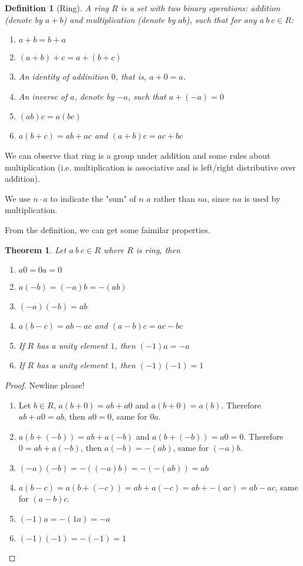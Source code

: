 \documentclass[14pt]{extarticle}
\newtheorem{theorem}{Theorem}[section]
\newtheorem{definition}{Definition}[section]
\newcommand{\1}{\{e\}}
\begin{document}
\begin{definition}[Ring]
  A ring $R$ is a set with two binary operations:
  addition (denote by $a + b$) and
  multiplication (denote by $ab$), such that
  for any $a \ b \ c \in R$:
  \begin{enumerate}
    \item $a + b = b + a$
    \item $(a + b) + c = a + (b + c)$
    \item An identity of addinition $0$, that is, $a + 0 = a$.
    \item An inverse of $a$, denote by $-a$, such that $a + (- a) = 0$
    \item $(ab)c = a(bc)$
    \item $a(b + c) = ab + ac$ and $(a + b)c = ac + bc$
  \end{enumerate}
\end{definition}

We can observe that ring is a group under addition and some
rules about multiplication 
(i.e. multiplication is associative and is left/right distributive over addition).

We use $n \cdot a$ to indicate the "sum" of $n$ $a$
rather than $na$, since $na$ is used by multiplication.

From the definition, we can get some faimilar properties.

\begin{theorem}
  Let $a \ b \ c \in R$ where $R$ is ring, then
  \begin{enumerate}
    \item $a0 = 0a = 0$
    \item $a(-b) = (-a)b = -(ab)$
    \item $(-a)(-b) = ab$
    \item $a(b - c) = ab - ac$ and $(a - b)c = ac - bc$
    \item If $R$ has a unity element $1$, then $(-1)a = -a$
    \item If $R$ has a unity element $1$, then $(-1)(-1) = 1$
  \end{enumerate}
\end{theorem}
\begin{proof}
  Newline please!
  \begin{enumerate}
    \item Let $b \in R$, $a(b + 0) = ab + a0$ and $a(b + 0) = a(b)$.
          Therefore $ab + a0 = ab$, then $a0 = 0$, same for $0a$.
    \item $a(b + (-b)) = ab + a(-b)$ and $a(b + (-b)) = a0 = 0$.
          Therefore $0 = ab + a(-b)$, then $a(-b) = -(ab)$,
          same for $(-a)b$.
    \item $(-a)(-b) = -((-a)b) = -(-(ab)) = ab$
    \item $a(b - c) = a(b + (-c)) = ab + a(-c) = ab + -(ac) = ab - ac$,
          same for $(a - b)c$.
    \item $(-1)a = -(1a) = -a$
    \item $(-1)(-1) = -(-1) = 1$
  \end{enumerate}
\end{proof}
\end{document}

